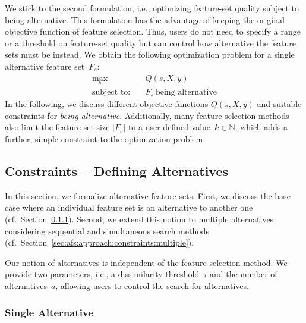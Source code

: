 \documentclass{article}
\theoremstyle{definition}
\begin{document}
We stick to the second formulation, i.e., optimizing feature-set quality subject to being alternative.
This formulation has the advantage of keeping the original objective function of feature selection.
Thus, users do not need to specify a range or a threshold on feature-set quality but can control how alternative the feature sets must be instead.
We obtain the following optimization problem for a single alternative feature set~$F_s$:
%
\begin{equation}
	\begin{aligned}
		\max_s &\quad Q(s,X,y) \\
		\text{subject to:} &\quad F_s~\text{being alternative}
	\end{aligned}
	\label{eq:afs:afs-general}
\end{equation}
%
In the following, we discuss different objective functions $Q(s,X,y)$ and suitable constraints for \emph{being alternative}.
Additionally, many feature-selection methods also limit the feature-set size $|F_s|$ to a user-defined value~$k \in \mathbb{N}$, which adds a further, simple constraint to the optimization problem.

\subsection{Constraints -- Defining Alternatives}
\label{sec:afs:approach:constraints}

In this section, we formalize alternative feature sets.
First, we discuss the base case where an individual feature set is an alternative to another one (cf.~Section~\ref{sec:afs:approach:constraints:single}).
Second, we extend this notion to multiple alternatives, considering sequential and simultaneous search methods (cf.~Section~\ref{sec:afs:approach:constraints:multiple}).

Our notion of alternatives is independent of the feature-selection method.
We provide two parameters, i.e., a dissimilarity threshold~$\tau$ and the number of alternatives~$a$, allowing users to control the search for alternatives.

\subsubsection{Single Alternative}
\label{sec:afs:approach:constraints:single}
\end{document}
